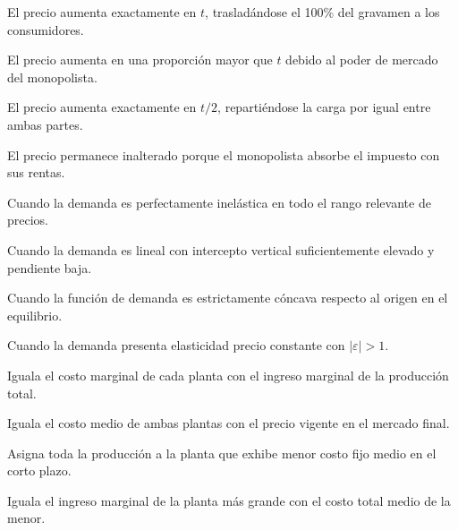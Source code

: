 \begin{opts}
    \item El precio aumenta exactamente en $t$, trasladándose el 100\% del gravamen a los consumidores.
    \item El precio aumenta en una proporción mayor que $t$ debido al poder de mercado del monopolista.
    \item El precio aumenta exactamente en $t/2$, repartiéndose la carga por igual entre ambas partes.
    \item El precio permanece inalterado porque el monopolista absorbe el impuesto con sus rentas.
\end{opts}

\begin{opts}
    \item Cuando la demanda es perfectamente inelástica en todo el rango relevante de precios.
    \item Cuando la demanda es lineal con intercepto vertical suficientemente elevado y pendiente baja.
    \item Cuando la función de demanda es estrictamente cóncava respecto al origen en el equilibrio.
    \item Cuando la demanda presenta elasticidad precio constante con $|\varepsilon| > 1$.
\end{opts}

\begin{opts}
    \item Iguala el costo marginal de cada planta con el ingreso marginal de la producción total.
    \item Iguala el costo medio de ambas plantas con el precio vigente en el mercado final.
    \item Asigna toda la producción a la planta que exhibe menor costo fijo medio en el corto plazo.
    \item Iguala el ingreso marginal de la planta más grande con el costo total medio de la menor.
\end{opts}

